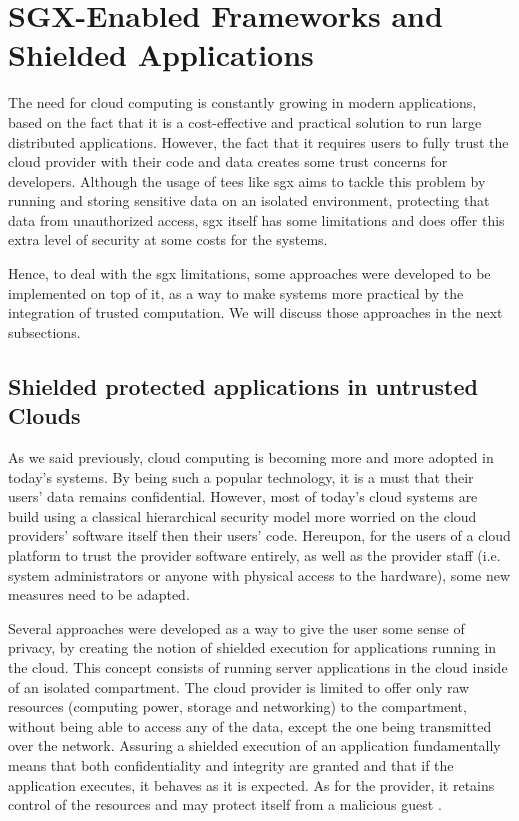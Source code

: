 

\section{SGX-Enabled Frameworks and Shielded Applications}
\label{sec:sgxFrameworks}
The need for cloud computing is constantly growing in modern applications, based on the fact that it is a cost-effective and practical solution to run large distributed applications. However, the fact that it requires users to fully trust the cloud provider with their code and data creates some trust concerns for developers.
Although the usage of \gls{tee}s like \gls{sgx} aims to tackle this problem by running and storing sensitive data on an isolated environment, protecting that data from unauthorized access, \gls{sgx} itself has some limitations and does offer this extra level of security at some costs for the systems. 

Hence, to deal with the \gls{sgx} limitations, some approaches were developed to be implemented on top of it, as a way to make systems more practical by the integration of trusted computation. 
We will discuss those approaches in the next subsections.



\subsection{Shielded protected applications in untrusted Clouds}
\label{ssec:shieldedApps}

As we said previously, cloud computing is becoming more and more adopted in today's systems. 
By being such a popular technology, it is a must that their users' data remains confidential. 
However, most of today's cloud systems are build using a classical hierarchical security model more worried on the cloud providers' software itself then their users' code. 
Hereupon, for the users of a cloud platform to trust the provider software entirely, as well as the provider staff (i.e. system administrators or anyone with physical access to the hardware), some new measures need to be adapted.

Several approaches were developed as a way to give the user some sense of privacy, by creating the notion of shielded execution for applications running in the cloud. 
This concept consists of running server applications in the cloud inside of an isolated compartment. The cloud provider is limited to offer only raw resources (computing power, storage and networking) to the compartment, without being able to access any of the  data, except the one being transmitted over the network. 
Assuring a shielded execution of an application fundamentally means that both confidentiality and integrity are granted and that if the application executes, it behaves as it is expected. As for the provider, it retains control of the resources and may protect itself from a malicious guest \cite{havenPaper}. 



